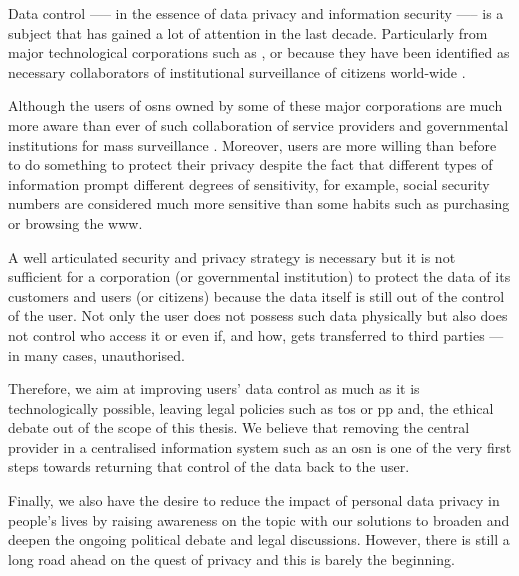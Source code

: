 \documentclass[showtrims,oldfontcommands]{kthesis}
\begin{document}

Data control —-- in the essence of data privacy and information security —-- is a 
subject that has gained a lot of attention in the last decade. Particularly from 
major technological corporations such as \Google, \Apple or \Facebook because they 
have been identified as necessary collaborators of institutional surveillance of 
citizens world-wide \cite{Lyon14}.

Although the users of \acp{osn} owned by some of these major corporations are much more 
aware than ever of such collaboration of service providers and governmental institutions 
for mass surveillance \cite{Madden14}. Moreover, users are more willing than before 
to do something to protect their privacy despite the fact that different types of 
information prompt different degrees of sensitivity, for example, social security 
numbers are considered much more sensitive than some habits such as purchasing or 
browsing the \ac{www}.

A well articulated security and privacy strategy is necessary but it is not sufficient 
for a corporation (or governmental institution) to protect the data of its customers 
and users (or citizens) because the data itself is still out of the control of the 
user. Not only the user does not possess such data physically but also does not 
control who access it or even if, and how, gets transferred to third parties --- 
in many cases, unauthorised.

Therefore, we aim at improving users' data control as much as it is technologically 
possible, leaving legal policies such as \ac{tos} or \ac{pp} and, the ethical debate 
out of the scope of this thesis. We believe that removing the central provider in 
a centralised information system such as an \ac{osn} is one of the very first steps 
towards returning that control of the data back to the user.

Finally, we also have the desire to reduce the impact of personal data privacy in 
people's lives by raising awareness on the topic with our solutions to broaden and 
deepen the ongoing political debate and legal discussions. However, there is still 
a long road ahead on the quest of privacy and this is barely the beginning.
\end{document}

